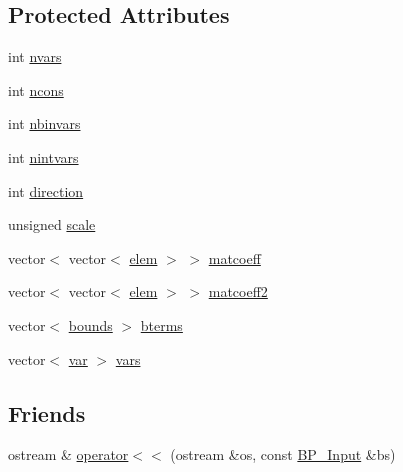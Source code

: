 \subsection*{Protected Attributes}
\begin{DoxyCompactItemize}
\item 
int \hyperlink{class_b_p___input_a5852fa6f08df71a7e6f7da18d29d00fb}{nvars}
\item 
int \hyperlink{class_b_p___input_aa4e9401b70ce5a85684c826dc91f0e22}{ncons}
\item 
int \hyperlink{class_b_p___input_a9248e80975fe67559644a53be0fdaced}{nbinvars}
\item 
int \hyperlink{class_b_p___input_a26d89d84381b238db05b8c89d7b948ce}{nintvars}
\item 
int \hyperlink{class_b_p___input_a815e964e6687ba9572ff5eded8428ab7}{direction}
\item 
unsigned \hyperlink{class_b_p___input_acee50c002d8261ef1b0fdd05af99c659}{scale}
\item 
vector$<$ vector$<$ \hyperlink{structelem}{elem} $>$ $>$ \hyperlink{class_b_p___input_ab55ff15bb47a828b7a3c83c32e1c18c3}{matcoeff}
\item 
vector$<$ vector$<$ \hyperlink{structelem}{elem} $>$ $>$ \hyperlink{class_b_p___input_a213441fb4dcffbe23c104142b4169d42}{matcoeff2}
\item 
vector$<$ \hyperlink{structbounds}{bounds} $>$ \hyperlink{class_b_p___input_a964eaa6ceec4d2edf5ab2e70338077a5}{bterms}
\item 
vector$<$ \hyperlink{structvar}{var} $>$ \hyperlink{class_b_p___input_a57b4dee2857fb8155af4521fca27fb89}{vars}
\end{DoxyCompactItemize}
\subsection*{Friends}
\begin{DoxyCompactItemize}
\item 
ostream \& \hyperlink{class_b_p___input_a5df5090f211b1f324a0318de57eed9f4}{operator$<$$<$} (ostream \&os, const \hyperlink{class_b_p___input}{B\-P\-\_\-\-Input} \&bs)
\end{DoxyCompactItemize}


